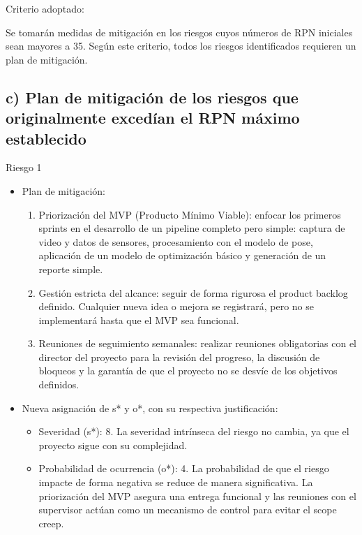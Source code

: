 \documentclass[
11pt, %
]{charter}
\begin{document}
Criterio adoptado:

Se tomarán medidas de mitigación en los riesgos cuyos números de RPN iniciales sean mayores a 35. Según este criterio, todos los riesgos identificados requieren un plan de mitigación.

\vspace{0.5cm}

\subsection*{c) Plan de mitigación de los riesgos que originalmente excedían el RPN máximo establecido}
 
Riesgo 1
\begin{itemize}
    \item Plan de mitigación:
    \begin{enumerate}
      \item Priorización del MVP (Producto Mínimo Viable): enfocar los primeros sprints en el desarrollo de un pipeline completo pero simple: captura de video y datos de sensores, procesamiento con el modelo de pose, aplicación de un modelo de optimización básico y generación de un reporte simple.
      \item Gestión estricta del alcance: seguir de forma rigurosa el product backlog definido. Cualquier nueva idea o mejora se registrará, pero no se implementará hasta que el MVP sea funcional.
      \item Reuniones de seguimiento semanales: realizar reuniones obligatorias con el director del proyecto para la revisión del progreso, la discusión de bloqueos y la garantía de que el proyecto no se desvíe de los objetivos definidos.
    \end{enumerate}
  \item Nueva asignación de s* y o*, con su respectiva justificación:
  \begin{itemize}
  \item Severidad (s*): 8. La severidad intrínseca del riesgo no cambia, ya que el proyecto sigue con su complejidad.
  \item Probabilidad de ocurrencia (o*): 4. La probabilidad de que el riesgo impacte de forma negativa se reduce de manera significativa. La priorización del MVP asegura una entrega funcional y las reuniones con el supervisor actúan como un mecanismo de control para evitar el scope creep.
  \end{itemize}
\end{itemize}
\end{document}

